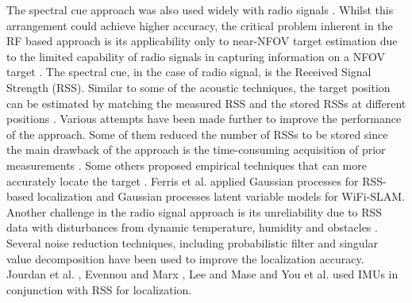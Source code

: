 \documentclass[letterpaper, 10 pt, conference]{ieeeconf}  %
\begin{document}
The spectral cue approach was also used widely with radio signals \cite{Bahl2000,lad04}.  Whilst this arrangement could achieve higher accuracy, the critical problem inherent in the RF based approach is its applicability only to near-NFOV target estimation due to the limited capability of radio signals in capturing information on a NFOV target \cite{Chen1999,Prigge2004,Seow2008,Khoury2009}.  The spectral cue, in the case of radio signal, is the Received Signal Strength (RSS).  Similar to some of the acoustic  techniques,  the  target  position can  be  estimated  by  matching  the measured RSS and the stored RSSs at different positions \cite{letchner2005large,bahl2000radar,ferris2006gaussian,ladd2004feasibility,kjaergaard2007taxonomy}.  Various attempts have been made further to improve the performance of the approach.  Some of them reduced the number of RSSs to be stored \cite{bahl2000radar,bahl2000software,robinson2005received,madigan2005bayesian} since the  main  drawback  of  the approach  is  the time-consuming acquisition  of prior  measurements \cite{ferris2007wifi,pan2007adaptive,yang2008estimating}.  Some others proposed empirical techniques that can more accurately locate the target \cite{nerguizian2006geolocation,haeberlen2004practical, ladd2004feasibility,pan2006multidimensional,brunato2005statistical}.  Ferris et al. applied Gaussian processes \cite{ferris2006gaussian} for RSS-based localization and Gaussian processes latent variable models \cite{ferris2007wifi} for WiFi-SLAM. Another challenge in the radio signal approach is its unreliability due to RSS data with disturbances from dynamic temperature, humidity and obstacles \cite{bahl2000software, lim2005zero, savvides2001dynamic, sun2005signal, whitehouse2007practical, yin2005adaptive, you2008impact}. Several noise reduction techniques, including probabilistic filter \cite{fang2008novel, ferris2007wifi, fang2008robust, haeberlen2004practical, ladd2004feasibility} and singular value decomposition \cite{fang2008robust} have been used to improve the localization accuracy. Jourdan et al. \cite{jourdan2005monte, jourdan2006wireless}, Evennou and Marx \cite{evennou2006advanced}, Lee and Mase \cite{lee2002activity} and You et al. \cite{you2008impact} used IMUs in conjunction with RSS for localization. 
\end{document}
